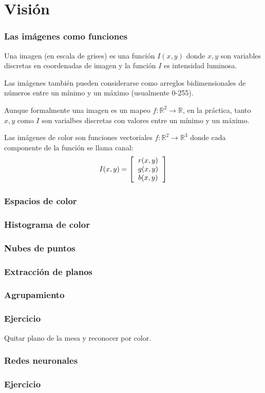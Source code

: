 \section{Visión}
\begin{frame}\frametitle{Las imágenes como funciones}
Una imagen (en escala de grises) es una función $I(x,y)$ donde $x,y$ son variables discretas en coordenadas de imagen y la función $I$ es intensidad luminosa.

  Las imágenes también pueden considerarse como arreglos bidimensionales de números entre un mínimo y un máximo (usualmente 0-255).

  Aunque formalmente una imagen es un mapeo $f:\mathbb{R}^2\rightarrow \mathbb{R}$, en la práctica, tanto $x,y$ como $I$ son varialbes discretas con valores entre un mínimo y un máximo.

  Las imágenes de color son funciones vectoriales $f:\mathbb{R}^2\rightarrow \mathbb{R}^3$ donde cada componente de la función se llama canal:
  \[I(x,y) = \left[\begin{tabular}{c}$r(x,y)$\\$g(x,y)$\\$b(x,y)$\end{tabular}\right]\]  
\end{frame}

\begin{frame}\frametitle{Espacios de color}
  
\end{frame}

\begin{frame}\frametitle{Histograma de color}
\end{frame}

\begin{frame}\frametitle{Nubes de puntos}
  
\end{frame}

\begin{frame}\frametitle{Extracción de planos}
  
\end{frame}


\begin{frame}\frametitle{Agrupamiento}
  
\end{frame}

\begin{frame}\frametitle{Ejercicio}
Quitar plano de la mesa y reconocer por color.   
\end{frame}

\begin{frame}\frametitle{Redes neuronales}
  
\end{frame}


\begin{frame}\frametitle{Ejercicio}
  
\end{frame}

